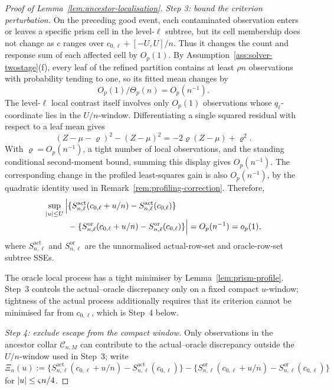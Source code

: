 \documentclass[11pt]{article}
\theoremstyle{plain}
\theoremstyle{definition}
\theoremstyle{remark}
\DeclarePairedDelimiter{\abs}{\lvert}{\rvert}
\begin{document}
\begin{proof}[Proof of Lemma~\ref{lem:ancestor-localisation}]
\emph{Step 3: bound the criterion perturbation.}
On the preceding good event, each contaminated observation enters or leaves
a specific prism cell in the level-\(\ell\) subtree, but its cell membership
does not change as \(c\) ranges over
\(c_{0,\ell}+[-U,U]/n\).  Thus it changes the count and response sum of each
affected cell by \(O_p(1)\).  By Assumption~\ref{ass:solver-twostage}(f),
every leaf of the refined partition contains at least \(\rho n\)
observations with probability tending to one, so its fitted mean changes by
\[
  O_p(1)/\Theta_p(n)=O_p(n^{-1}).
\]
The level-\(\ell\) local contrast itself involves only \(O_p(1)\) observations
whose \(q_\ell\)-coordinate lies in the \(U/n\)-window.  Differentiating a
single squared residual with respect to a leaf mean gives
\[
  (Z-\mu-\varrho)^2-(Z-\mu)^2
  =
  -2\varrho(Z-\mu)+\varrho^2.
\]
With \(\varrho=O_p(n^{-1})\), a tight number of local observations, and the
standing
conditional second-moment bound, summing this display gives \(O_p(n^{-1})\).
The corresponding change in the profiled least-squares gain is also
\(O_p(n^{-1})\), by the quadratic identity used in
Remark~\ref{rem:profiling-correction}.  Therefore,
\begin{align}
\label{eq:ancestor-op}
  \sup_{\abs u\le U}
  \Big|
  &\{S^{\mathrm{act}}_{n,\ell}(c_{0,\ell}+u/n)
     -S^{\mathrm{act}}_{n,\ell}(c_{0,\ell})\}
  \nonumber\\[-2pt]
  &-
  \{S^{\mathrm{or}}_{n,\ell}(c_{0,\ell}+u/n)
     -S^{\mathrm{or}}_{n,\ell}(c_{0,\ell})\}
  \Big|
  =
  O_p(n^{-1})
  =
  o_p(1),
\end{align}
where \(S^{\mathrm{act}}_{n,\ell}\) and \(S^{\mathrm{or}}_{n,\ell}\) are the
unnormalised actual-row-set and oracle-row-set subtree SSEs.

The oracle local process has a tight minimiser by
Lemma~\ref{lem:prism-profile}. Step~3 controls the actual--oracle
discrepancy only on a fixed compact $u$-window; tightness of the actual
process additionally requires that its criterion cannot be minimised far
from $c_{0,\ell}$, which is Step~4 below.

\emph{Step 4: exclude escape from the compact window.} Only observations in
the ancestor collar $\mathcal C_{n,M}$ can contribute to the actual--oracle
discrepancy outside the $U/n$-window used in Step~3; write
\[
  \Xi_n(u)
  :=
  \{S^{\mathrm{act}}_{n,\ell}(c_{0,\ell}+u/n)-S^{\mathrm{act}}_{n,\ell}(c_{0,\ell})\}
  -
  \{S^{\mathrm{or}}_{n,\ell}(c_{0,\ell}+u/n)-S^{\mathrm{or}}_{n,\ell}(c_{0,\ell})\}
\]
for $\abs u\le\varsigma n/4$.


\end{proof}
\end{document}
